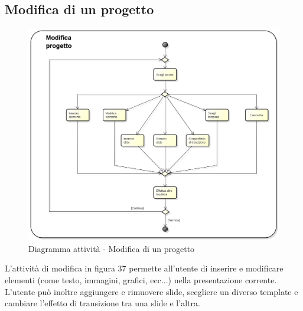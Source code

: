 \subsection{Modifica di un progetto}
\begin{figure}[h] 
	\centering 
	\includegraphics[scale=0.3] {img/activity_modifica.png} 
	\caption{Diagramma attività - Modifica di un progetto} 
\end{figure}
L'attività di modifica in figura 37 permette all'utente di inserire e modificare elementi (come testo, immagini, grafici, ecc...) nella presentazione corrente. L'utente può inoltre aggiungere e rimuovere slide, scegliere un diverso template e cambiare l'effetto di transizione tra una slide e l'altra.
\newpage

